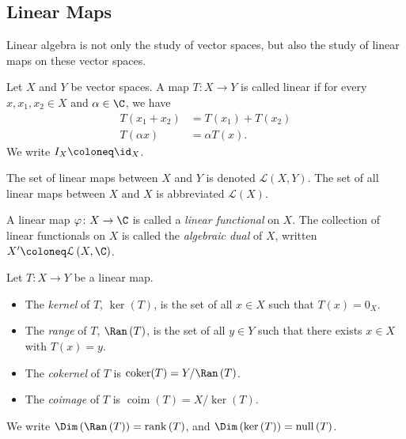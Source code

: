 \subsection{Linear Maps}%
Linear algebra is not only the study of vector spaces, but also the study of linear maps on these vector spaces. 
\begin{definition}
  Let $X$ and $Y$ be vector spaces. A map $T\colon X\rightarrow Y$ is called linear if for every $x,x_1,x_2\in X$ and $\alpha\in \C$, we have
  \begin{align*}
    T\left(x_1 + x_2\right) &= T\left(x_1\right) + T\left(x_2\right)\\
    T\left(\alpha x\right) &= \alpha T\left(x\right).
  \end{align*}
  We write $I_{X} \coloneq \id_{X}$.\newline

  The set of linear maps between $X$ and $Y$ is denoted $\mathcal{L}\left(X,Y\right)$. The set of all linear maps between $X$ and $X$ is abbreviated $\mathcal{L}\left(X\right)$.\newline

  A linear map $\varphi\colon X\rightarrow \C$ is called a \textit{linear functional} on $X$. The collection of linear functionals on $X$ is called the \textit{algebraic dual} of $X$, written $X' \coloneq \mathcal{L}\left(X,\C\right)$.
\end{definition}

\begin{definition}
  Let $T\colon X\rightarrow Y$ be a linear map.
  \begin{itemize}
    \item The \textit{kernel} of $T$, $\ker\left(T\right)$, is the set of all $x\in X$ such that $T(x) = 0_X$.
    \item The \textit{range} of $T$, $\Ran\left(T\right)$, is the set of all $y\in Y$ such that there exists $x\in X$ with $T(x) = y$.
    \item The \textit{cokernel} of $T$ is $\operatorname{coker}(T) = Y/\Ran\left(T\right)$.
    \item The \textit{coimage} of $T$ is $\operatorname{coim}\left(T\right) = X/\ker\left(T\right)$.
  \end{itemize}
  We write $\Dim\left(\Ran\left(T\right)\right) = \operatorname{rank}\left(T\right)$, and $\Dim\left(\ker\left(T\right)\right) = \operatorname{null}\left(T\right)$.
\end{definition}
%

